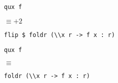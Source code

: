 \documentclass{gift}
\begin{document}
\begin{giftMO}
\verb!qux f!
\begin{giftFragmento}
\end  {giftFragmento}

$\equiv +  2$
\begin{giftFragmento}
\end  {giftFragmento}

\verb!flip $ foldr (\\x r -> f x : r)!
\begin{giftFragmento}
\end  {giftFragmento}


\item \begin{giftFragmento}
\end  {giftFragmento}

\verb!qux f!
\begin{giftFragmento}
\end  {giftFragmento}

$\equiv$
\begin{giftFragmento}
\end  {giftFragmento}

\verb!foldr (\\x r -> f x : r)!
\begin{giftFragmento}
\end  {giftFragmento}


\end  {giftMO}

\begin{giftFragmento}
\end  {giftFragmento}


\begin{giftComentario}
 
\end  {giftComentario}
\end{document}
